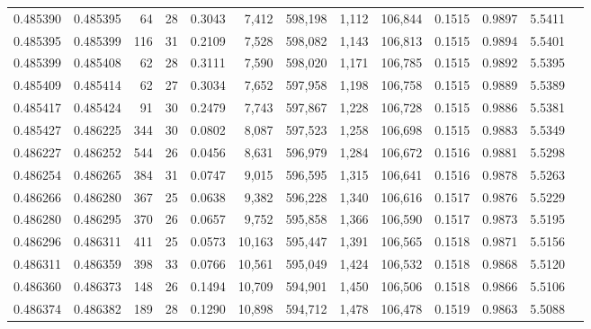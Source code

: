 \begin{tabular}{rrrrrrrrrrrrr}
0.485390 & 0.485395 &  64 &  28 &                                     0.3043 &   7,412 & 598,198 &   1,112 & 106,844 & 0.1515 & 0.9897 & 5.5411 \\
0.485395 & 0.485399 & 116 &  31 &                                     0.2109 &   7,528 & 598,082 &   1,143 & 106,813 & 0.1515 & 0.9894 & 5.5401 \\
0.485399 & 0.485408 &  62 &  28 &                                     0.3111 &   7,590 & 598,020 &   1,171 & 106,785 & 0.1515 & 0.9892 & 5.5395 \\
0.485409 & 0.485414 &  62 &  27 &                                     0.3034 &   7,652 & 597,958 &   1,198 & 106,758 & 0.1515 & 0.9889 & 5.5389 \\
0.485417 & 0.485424 &  91 &  30 &                                     0.2479 &   7,743 & 597,867 &   1,228 & 106,728 & 0.1515 & 0.9886 & 5.5381 \\
0.485427 & 0.486225 & 344 &  30 &                                     0.0802 &   8,087 & 597,523 &   1,258 & 106,698 & 0.1515 & 0.9883 & 5.5349 \\
0.486227 & 0.486252 & 544 &  26 &                                     0.0456 &   8,631 & 596,979 &   1,284 & 106,672 & 0.1516 & 0.9881 & 5.5298 \\
0.486254 & 0.486265 & 384 &  31 &                                     0.0747 &   9,015 & 596,595 &   1,315 & 106,641 & 0.1516 & 0.9878 & 5.5263 \\
0.486266 & 0.486280 & 367 &  25 &                                     0.0638 &   9,382 & 596,228 &   1,340 & 106,616 & 0.1517 & 0.9876 & 5.5229 \\
0.486280 & 0.486295 & 370 &  26 &                                     0.0657 &   9,752 & 595,858 &   1,366 & 106,590 & 0.1517 & 0.9873 & 5.5195 \\
0.486296 & 0.486311 & 411 &  25 &                                     0.0573 &  10,163 & 595,447 &   1,391 & 106,565 & 0.1518 & 0.9871 & 5.5156 \\
0.486311 & 0.486359 & 398 &  33 &                                     0.0766 &  10,561 & 595,049 &   1,424 & 106,532 & 0.1518 & 0.9868 & 5.5120 \\
0.486360 & 0.486373 & 148 &  26 &                                     0.1494 &  10,709 & 594,901 &   1,450 & 106,506 & 0.1518 & 0.9866 & 5.5106 \\
0.486374 & 0.486382 & 189 &  28 &                                     0.1290 &  10,898 & 594,712 &   1,478 & 106,478 & 0.1519 & 0.9863 & 5.5088 \\

\end{tabular}
